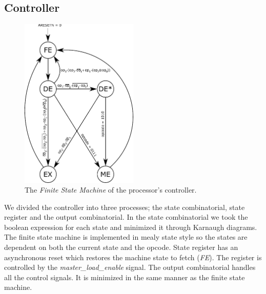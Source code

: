 \documentclass[a4,11pt]{article}
\begin{document}
\subsection{Controller}

\begin{figure}[h!]
	\centering
	\includegraphics[width=0.5\textwidth]{Figurer/procController_FSM_Mealy}
	\caption{The {\it Finite State Machine} of the processor's controller.}
	\label{fig:fsm}
\end{figure}


We divided the controller into three processes; the state combinatorial, state register and
the output combinatorial. In the state combinatorial we took the boolean expression for each 
state and minimized it through Karnaugh diagrams. The finite state machine is implemented in 
mealy state style so the states are dependent on both the current state and the opcode. 
State register has an asynchronous reset which restores the machine state to fetch ({\it FE}). 
The register is controlled by the \emph{master\_load\_enable} signal. The output combinatorial 
handles all the control signals. It is minimized in the same manner as the finite state machine.
\end{document}
